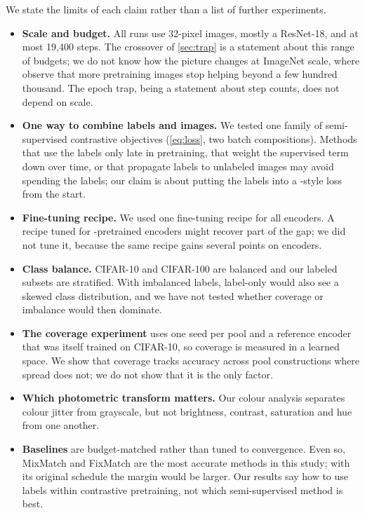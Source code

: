We state the limits of each claim rather than a list of further experiments.
\begin{itemize}[leftmargin=*]
\item \textbf{Scale and budget.} All runs use 32-pixel images, mostly a ResNet-18, and at most 19,400 steps. The
crossover of \cref{sec:trap} is a statement about this range of budgets; we do not know how the picture changes
at ImageNet scale, where \citet{cole2022when} observe that more pretraining images stop helping beyond a few
hundred thousand. The epoch trap, being a statement about step counts, does not depend on scale.
\item \textbf{One way to combine labels and images.} We tested one family of semi-supervised contrastive
objectives (\cref{eq:loss}, two batch compositions). Methods that use the labels only late in pretraining, that
weight the supervised term down over time, or that propagate labels to unlabeled images
\citep{assran2021paws,sohn2020fixmatch} may avoid spending the labels; our claim is about putting the labels into
a \supcon-style loss from the start.
\item \textbf{Fine-tuning recipe.} We used one fine-tuning recipe for all encoders. A recipe tuned for
\supcon-pretrained encoders might recover part of the gap; we did not tune it, because the same recipe gains
several points on \simclr encoders.
\item \textbf{Class balance.} CIFAR-10 and CIFAR-100 are balanced and our labeled subsets are stratified. With
imbalanced labels, label-only \supcon would also see a skewed class distribution, and we have not tested
whether coverage or imbalance would then dominate.
\item \textbf{The coverage experiment} uses one seed per pool and a reference encoder that was itself trained
on CIFAR-10, so coverage is measured in a learned space. We show that coverage tracks accuracy across pool
constructions where spread does not; we do not show that it is the only factor.
\item \textbf{Which photometric transform matters.} Our colour analysis separates colour jitter from grayscale,
but not brightness, contrast, saturation and hue from one another.
\item \textbf{Baselines} are budget-matched rather than tuned to convergence. Even so, MixMatch and FixMatch are the most
accurate methods in this study; with its original schedule the margin would be larger. Our results say how to use
labels within contrastive pretraining, not which semi-supervised method is best.
\end{itemize}

